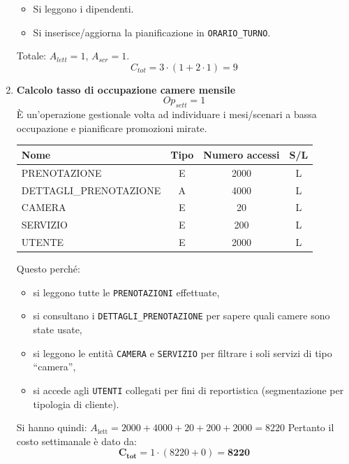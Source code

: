 \documentclass[a4paper,12pt]{report}
\begin{document}
\begin{enumerate}
    \begin{itemize}
      \item Si leggono i dipendenti.
      \item Si inserisce/aggiorna la pianificazione in \texttt{ORARIO\_TURNO}.
    \end{itemize}

    Totale: $A_{lett}=1$, $A_{scr}=1$. \\
    $$C_{tot} = 3 \cdot (1 + 2 \cdot 1) = 9$$
    
    
	\item {\large \textbf{Calcolo tasso di occupazione camere mensile}} \label{op19}
   $$
   {Op}_{sett} = 1
   $$
    È un'operazione gestionale volta ad individuare i mesi/scenari a bassa occupazione e pianificare promozioni mirate. 

    \begin{table}[H]
    \centering
    \small
    \renewcommand{\arraystretch}{1.15}
    \begin{tabularx}{0.8\textwidth}{|X|c|c|c|}
        \hline
        \rowcolor{gray!20}
        \textbf{Nome} & \textbf{Tipo} & \textbf{Numero accessi} & \textbf{S/L} \\
        \hline
        PRENOTAZIONE & E & 2000 & L \\
        DETTAGLI\_PRENOTAZIONE & A & 4000 & L \\
        CAMERA & E & 20 & L \\
        SERVIZIO & E & 200 & L \\
        UTENTE & E & 2000 & L \\
        \hline
    \end{tabularx}
    \end{table}

    Questo perché:  
    \begin{itemize}
        \item si leggono tutte le \texttt{PRENOTAZIONI} effettuate,  
        \item si consultano i \texttt{DETTAGLI\_PRENOTAZIONE} per sapere quali camere sono state usate,  
        \item si leggono le entità \texttt{CAMERA} e \texttt{SERVIZIO} per filtrare i soli servizi di tipo “camera”,  
        \item si accede agli \texttt{UTENTI} collegati per fini di reportistica (segmentazione per tipologia di cliente).  
    \end{itemize}

    Si hanno quindi: $A_{\text{lett}} = 2000 + 4000 + 20 + 200 + 2000 = 8220$  
    Pertanto il costo settimanale è dato da:
    $$
    \mathbf{C_{tot}} = 1 \cdot (8220 + 0) = \mathbf{8220}
    $$    



\end{enumerate}
\end{document}
